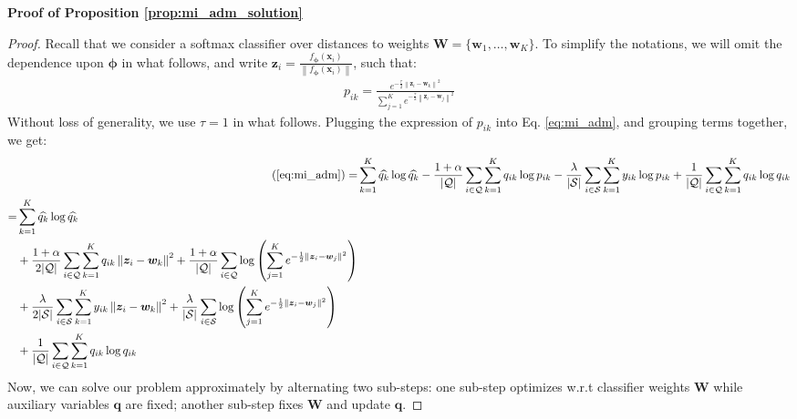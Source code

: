 \documentclass{article}
\newcommand{\x}{\bm{x}} \newcommand{\w}{\bm{w}} \newcommand{\p}{\bm{p}} \newcommand{\q}{\bm{q}} \newcommand{\cc}{\bm{c}} \newcommand{\y}{\bm{y}} \newcommand{\z}{\bm{z}} \newcommand{\Dcos}{D^{\text{cos}}}
\newcommand{\norm}[1]{\left\lVert#1\right\rVert}
\begin{document}
    
    
	\textbf{Proof of Proposition \ref{prop:mi_adm_solution}}
    	\begin{proof}
            Recall that we consider a softmax classifier over distances to weights $\mathbf{W}=\{\w_1, \dots, \w_K\}$. To simplify the notations, we will omit the dependence upon $\boldsymbol{\phi}$ in what follows, and write ${\z_i=\frac{f_{\boldsymbol{\phi}}(\x_i)}{\norm{f_{\boldsymbol{\phi}}(\x_i)}}}$, such that:
            \begin{align}
                p_{ik} = \frac{e^{-\frac{\tau}{2}\norm{\z_i - \w_k}^2}}{\sum_{j=1}^K e^{-\frac{\tau}{2}\norm{\z_i - \w_j}^2}}
            \end{align}
            Without loss of generality, we use $\tau=1$ in what follows. Plugging the expression of $p_{ik}$ into Eq. \eqref{eq:mi_adm}, and grouping terms together, we get:
            \begin{align}\label{eq:update_proof_1}
                (\ref{eq:mi_adm}) =& \sum_{k=1}^K \widehat{q_k} \log \widehat{q_k} - \frac{1+\alpha}{|\mathcal{Q}|} \sum_{i \in \mathcal{Q}} \sum_{k=1}^K q_{ik} \log p_{ik}  - \frac{\lambda}{|\mathcal{S}|} \sum_{i \in \mathcal{S}} \sum_{k=1}^K y_{ik} \log p_{ik} + \frac{1}{|\mathcal{Q}|} \sum_{i \in \mathcal{Q}}\sum_{k=1}^K q_{ik} \log q_{ik} \nonumber \\
                \begin{split}
                    =& \sum_{k=1}^K \widehat{q_k} \log \widehat{q_k} \\
                    & +\frac{1+\alpha}{2|\mathcal{Q}|} \sum_{i \in \mathcal{Q}} \sum_{k=1}^K q_{ik} \norm{\z_i - \w_k}^2 + \frac{1+\alpha}{|\mathcal{Q}|} \sum_{i \in \mathcal{Q}} \log \left (\sum_{j=1}^K e^{-\frac{1}{2}\norm{\z_i - \w_j}^2} \right ) \\
                    & + \frac{\lambda}{2|\mathcal{S}|} \sum_{i \in \mathcal{S}}\sum_{k=1}^K y_{ik} \norm{\z_i - \w_k}^2 + \frac{\lambda}{|\mathcal{S}|} \sum_{i \in \mathcal{S}} \log \left (\sum_{j=1}^K e^{-\frac{1}{2}\norm{\z_i - \w_j}^2} \right ) \\
                    & + \frac{1}{|\mathcal{Q}|} \sum_{i \in \mathcal{Q}} \sum_{k=1}^K q_{ik} \log q_{ik}
                \end{split}
            \end{align}
            Now, we can solve our problem approximately by alternating two sub-steps: 
            one sub-step optimizes w.r.t classifier weights $\mathbf{W}$ while auxiliary variables $\q$ are fixed; another sub-step fixes $\mathbf{W}$ and update $\q$.

\end{proof}
\end{document}
